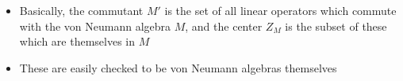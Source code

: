 \documentclass[12pt,a4paper]{article}
\numberwithin{equation}{section}
\theoremstyle{definition}
\newtheorem{definition}{Definition}[section]
\theoremstyle{theorem}
\begin{document}
\begin{itemize}
\begin{definition}[Commutant]
\begin{equation}
				M'\equiv\left\{y\in\lops\,|\,xy=yx,\,\forall x\in M\right\}
			\end{equation}
		\end{definition}
		\begin{definition}[Center]
			Given von Neumann algebra $M$ on $\mathcal{H}$, the \textbf{center} of $M$, denoted $Z_{M}$, is
			\begin{equation}
				Z_{M}\equiv M\cap M'
			\end{equation}
		\end{definition}
		\item Basically, the commutant $M'$ is the set of all linear operators which commute with the von Neumann algebra $M$, and the center $Z_{M}$ is the subset of these which are themselves in $M$
		\item These are easily checked to be von Neumann algebras themselves
	\end{itemize}
\end{document}
